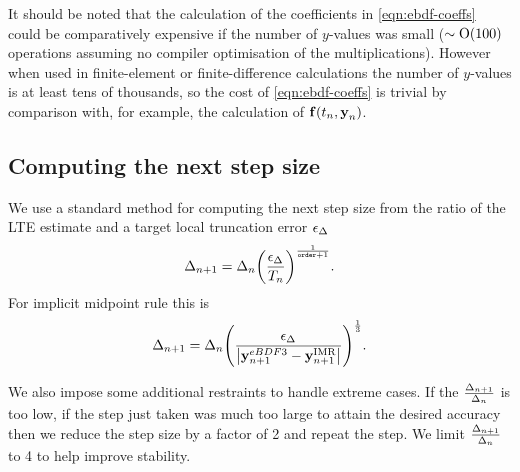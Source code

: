 It should be noted that the calculation of the coefficients in \cref{eqn:ebdf-coeffs} could be comparatively expensive if the number of $y$-values was small ($\sim \mathrm{O}{\left( 100 \right)}$ operations assuming no compiler optimisation of the multiplications).
However when used in finite-element or finite-difference calculations the number of $y$-values is at least tens of thousands, so the cost of \cref{eqn:ebdf-coeffs} is trivial by comparison with, for example, the calculation of ${\boldsymbol{\mathrm{f}}{\left( t_n, \boldsymbol{\mathrm{y}}_n \right)}}$.


\subsection{Computing the next step size}

We use a standard method \cite[pg.268]{GreshoSani} for computing the next step size from the ratio of the LTE estimate and a target local truncation error $\epsilon_{\Delta_{}}$
\begin{equation}
\Delta_{n+1} = \Delta_{n} {\left(  \frac{\epsilon_{\Delta_{}}}{T_n}  \right)}^{\frac{1}{\texttt{order}+1}}.
\end{equation}
For implicit midpoint rule this is
\begin{equation}
  \Delta_{n+1} = \Delta_{n} {\left(  \frac{\epsilon_{\Delta_{}}}{\left|{\boldsymbol{\mathrm{y}}_{n+1}^{eBDF3} - \boldsymbol{\mathrm{y}}_{n+1}^{\mathrm{IMR}}} \right|}  \right)}^{\frac{1}{3}}.
  \label{eq:next-step-dt}
\end{equation}

We also impose some additional restraints to handle extreme cases.
If the $\frac{\Delta_{n+1}}{\Delta_{n}}$ is too low, \ie if the step just taken was much too large to attain the desired accuracy then we reduce the step size by a factor of 2 and repeat the step.
We limit $\frac{\Delta_{n+1}}{\Delta_{n}}$ to 4 to help improve stability.






